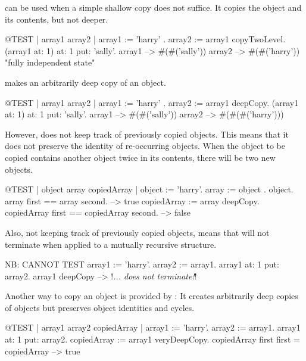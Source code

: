 \documentclass[a4paper,10pt,twoside]{book}
\begin{document}
 can be used when a simple shallow copy does not suffice. It copies the object and its contents, but not deeper.

\begin{code}{@TEST | array1 array2 |}
array1 := { { 'harry' } } .
array2 := array1 copyTwoLevel.
(array1 at: 1) at: 1 put: 'sally'.
array1 --> #(#('sally'))
array2 --> #(#('harry'))    "fully independent state"
\end{code}

 makes an arbitrarily deep copy of an object.

\begin{code}{@TEST | array1 array2 |}
array1 := { { { 'harry' } } } .
array2 := array1 deepCopy.
(array1 at: 1) at: 1 put: 'sally'.
array1 --> #(#('sally'))
array2 --> #(#(#('harry')))
\end{code}

However,  does not keep track of previously copied objects. This means that it does not preserve the identity of re-occurring objects. When the object to be copied contains another object twice in its contents, there will be two new objects. 

\begin{code}{@TEST | object array copiedArray |}
object := {'harry'}.
array := {object . object}.
array first == array second. --> true
copiedArray := array deepCopy.
copiedArray first == copiedArray second. --> false
\end{code}

Also, not keeping track of previously copied objects, means that  will not terminate when applied to a mutually recursive structure.

\begin{code}{NB: CANNOT TEST}
array1 := {'harry'}.
array2 := {array1}.
array1 at: 1 put: array2.
array1 deepCopy --> !\emph{... does not terminate!}!
\end{code}

Another way to copy an object is provided by : 
It creates arbitrarily deep copies of objects but preserves object identities and cycles. 

\begin{code}{@TEST | array1 array2 copiedArray |}
array1 := {'harry'}.
array2 := {array1}.
array1 at: 1 put: array2.
copiedArray := array1 veryDeepCopy.
copiedArray first first = copiedArray --> true
\end{code}
\end{document}
